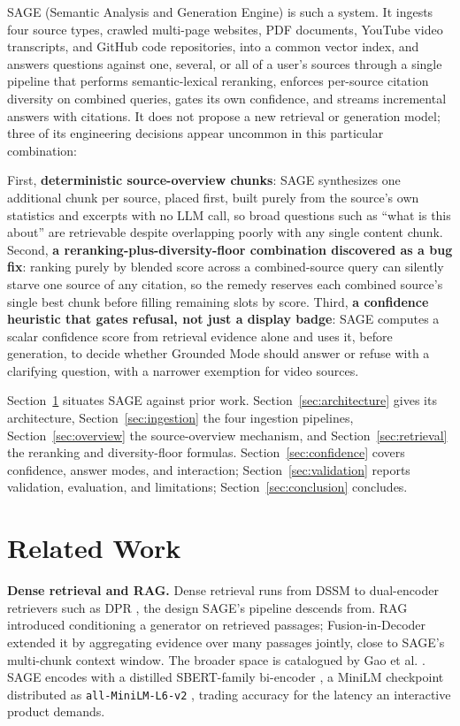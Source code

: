 \documentclass[conference]{IEEEtran}
\begin{document}
SAGE (Semantic Analysis and Generation Engine) is such a system. It ingests four source types, crawled multi-page websites, PDF documents, YouTube video transcripts, and GitHub code repositories, into a common vector index, and answers questions against one, several, or all of a user's sources through a single pipeline that performs semantic-lexical reranking, enforces per-source citation diversity on combined queries, gates its own confidence, and streams incremental answers with citations. It does not propose a new retrieval or generation model; three of its engineering decisions appear uncommon in this particular combination:

First, \textbf{deterministic source-overview chunks}: SAGE synthesizes one additional chunk per source, placed first, built purely from the source's own statistics and excerpts with no LLM call, so broad questions such as ``what is this about'' are retrievable despite overlapping poorly with any single content chunk. Second, \textbf{a reranking-plus-diversity-floor combination discovered as a bug fix}: ranking purely by blended score across a combined-source query can silently starve one source of any citation, so the remedy reserves each combined source's single best chunk before filling remaining slots by score. Third, \textbf{a confidence heuristic that gates refusal, not just a display badge}: SAGE computes a scalar confidence score from retrieval evidence alone and uses it, before generation, to decide whether Grounded Mode should answer or refuse with a clarifying question, with a narrower exemption for video sources.

Section~\ref{sec:related} situates SAGE against prior work. Section~\ref{sec:architecture} gives its architecture, Section~\ref{sec:ingestion} the four ingestion pipelines, Section~\ref{sec:overview} the source-overview mechanism, and Section~\ref{sec:retrieval} the reranking and diversity-floor formulas. Section~\ref{sec:confidence} covers confidence, answer modes, and interaction; Section~\ref{sec:validation} reports validation, evaluation, and limitations; Section~\ref{sec:conclusion} concludes.

\section{Related Work}
\label{sec:related}

\textbf{Dense retrieval and RAG.} Dense retrieval runs from DSSM \cite{huang2013dssm} to dual-encoder retrievers such as DPR \cite{karpukhin2020dpr}, the design SAGE's pipeline descends from. RAG \cite{lewis2020rag} introduced conditioning a generator on retrieved passages; Fusion-in-Decoder \cite{izacard2021fid} extended it by aggregating evidence over many passages jointly, close to SAGE's multi-chunk context window. The broader space is catalogued by Gao et al. \cite{gao2023ragsurvey}. SAGE encodes with a distilled SBERT-family bi-encoder \cite{reimers2019sbert}, a MiniLM checkpoint \cite{wang2020minilm,wang2020minilmv2} distributed as \texttt{all-MiniLM-L6-v2} \cite{minilm_modelcard}, trading accuracy for the latency an interactive product demands.
\end{document}
